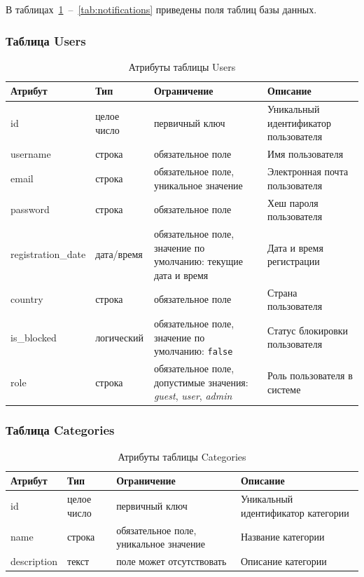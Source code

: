 \clearpage
В таблицах~\ref{tab:users}~--~\ref{tab:notifications} приведены поля таблиц базы данных.

\subsubsection*{Таблица Users}

\begin{table}[H]
\centering
\caption{Атрибуты таблицы Users}
\label{tab:users}
\renewcommand{\arraystretch}{1.3}
\begin{tabular}{|p{3.5cm}|p{3cm}|p{4cm}|p{4.5cm}|}
\hline
\textbf{Атрибут} & \textbf{Тип} & \textbf{Ограничение} & \textbf{Описание} \\
\hline
id & целое число & первичный ключ & Уникальный идентификатор пользователя \\
\hline
username & строка & обязательное поле & Имя пользователя \\
\hline
email & строка & обязательное поле, уникальное значение & Электронная почта пользователя \\
\hline
password & строка & обязательное поле & Хеш пароля пользователя \\
\hline
registration\_date & дата/время & обязательное поле, значение по умолчанию: текущие дата и время & Дата и время регистрации \\
\hline
country & строка & обязательное поле & Страна пользователя \\
\hline
is\_blocked & логический & обязательное поле, значение по умолчанию: \texttt{false} & Статус блокировки пользователя \\
\hline
role & строка & обязательное поле, допустимые значения: \textit{guest}, \textit{user}, \textit{admin} & Роль пользователя в системе \\
\hline
\end{tabular}
\end{table}

\subsubsection*{Таблица Categories}

\begin{table}[H]
\centering
\caption{Атрибуты таблицы Categories}
\label{tab:categories}
\renewcommand{\arraystretch}{1.3}
\begin{tabular}{|p{3.5cm}|p{3cm}|p{4cm}|p{4.5cm}|}
\hline
\textbf{Атрибут} & \textbf{Тип} & \textbf{Ограничение} & \textbf{Описание} \\
\hline
id & целое число & первичный ключ & Уникальный идентификатор категории \\
\hline
name & строка & обязательное поле, уникальное значение & Название категории \\
\hline
description & текст & поле может отсутствовать & Описание категории \\
\hline
\end{tabular}
\end{table}

